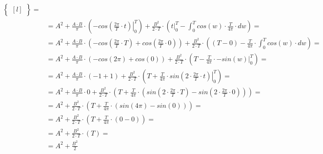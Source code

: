 \begin{task}
\begin{align*}
\begin{Bmatrix*}[l]
 \end{Bmatrix*}=\\
 &=A^2 + \frac{A \cdot B}{\pi} \cdot \left( \left.-cos\left(\frac{2\pi}{T} \cdot t \right)\right|_{0}^{T}  \right) + \frac{B^2}{2 \cdot T} \cdot \left( \left. t \right|_{0}^{T} - \int_{0}^{T} cos\left(w \right)  \cdot \frac{T}{4\pi} \cdot dw \right)=\\
 &=A^2 + \frac{A \cdot B}{\pi} \cdot  \left(-cos\left(\frac{2\pi}{T} \cdot T \right)+cos\left(\frac{2\pi}{T} \cdot 0 \right)\right) + \frac{B^2}{2 \cdot T}  \cdot \left( \left(T - 0 \right) - \frac{T}{4\pi} \cdot \int_{0}^{T} cos\left(w \right)  \cdot dw \right)=\\
 &=A^2 + \frac{A \cdot B}{\pi} \cdot  \left(-cos\left(2\pi \right)+cos\left(0 \right)\right) + \frac{B^2}{2 \cdot T}  \cdot \left( T - \frac{T}{4\pi} \cdot \left. -sin\left(w \right)  \right|_{0}^{T} \right)=\\
 &=A^2 + \frac{A \cdot B}{\pi} \cdot  \left(-1+1\right) + \frac{B^2}{2 \cdot T}  \cdot \left( T + \frac{T}{4\pi} \cdot \left. sin\left(2\cdot \frac{2\pi}{T}\cdot t \right)  \right|_{0}^{T} \right)=\\
 &=A^2 + \frac{A \cdot B}{\pi}\cdot 0 + \frac{B^2}{2 \cdot T} \cdot \left( T + \frac{T}{4\pi} \cdot \left( sin\left(2\cdot \frac{2\pi}{T}\cdot T \right) - sin\left(2\cdot \frac{2\pi}{T}\cdot 0 \right) \right) \right)=\\
 &=A^2 + \frac{B^2}{2 \cdot T}  \cdot \left( T + \frac{T}{4\pi} \cdot \left( sin\left(4\pi \right) - sin\left( 0 \right) \right) \right)=\\
 &=A^2 + \frac{B^2}{2 \cdot T}  \cdot \left( T + \frac{T}{4\pi} \cdot \left( 0 - 0 \right) \right)=\\
 &=A^2 + \frac{B^2}{2 \cdot T}  \cdot \left( T \right)=\\
 &=A^2 + \frac{B^2}{2}
\end{align*}

\end{task}